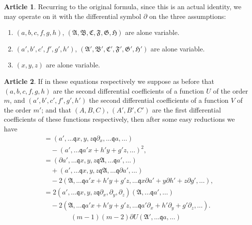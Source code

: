 \documentclass[11pt,a4paper]{article}
\theoremstyle{definition}
\newtheorem{art}{Article}[section]
\newcommand{\fA}{\mathfrak{A}}
\newcommand{\fB}{\mathfrak{B}}
\newcommand{\fC}{\mathfrak{C}}
\newcommand{\fF}{\mathfrak{F}}
\newcommand{\fG}{\mathfrak{G}}
\newcommand{\fH}{\mathfrak{H}}
\newcommand{\fApr}{\mathfrak{A}'}
\newcommand{\fBpr}{\mathfrak{B}'}
\newcommand{\fCpr}{\mathfrak{C}'}
\newcommand{\fFpr}{\mathfrak{F}'}
\newcommand{\fGpr}{\mathfrak{G}'}
\newcommand{\fHpr}{\mathfrak{H}'}
\begin{document}
\setcounter{art}{43}
\begin{art}
Recurring to the original formula, since this is an actual identity, we may
operate on it with the differential symbol $\partial$ on the three assumptions:
\begin{enumerate}[label=\arabic*.]
\item $(a, b, c, f, g, h)$, $(\fA, \fB, \fC, \fF, \fG, \fH)$ are alone variable.
\item $(a', b', c', f', g', h')$, $(\fApr, \fBpr, \fCpr, \fFpr, \fGpr, \fHpr)$ are alone variable.
\item $(x, y, z)$ are alone variable.
\end{enumerate}
\end{art}

\setcounter{art}{44}
\begin{art}
If in these equations respectively we suppose as before that $(a, b, c, f, g, h)$
are the second differential coefficients of a function $U$ of the order $m$, and
$(a', b', c', f', g', h')$ the second differential coefficients of a function $V$ of the order $m'$;
and that $(A, B, C)$, $(A', B', C')$ are the first differential coefficients of these functions
respectively, then after some easy reductions we have
\begin{align*}
&= (a', \dots \mathbin{\mathfrak{q}} x, y, z \mathbin{\mathfrak{q}} \partial_x, \dots \mathbin{\mathfrak{q}} a, \dots) \\
&\quad - (a', \dots \mathbin{\mathfrak{q}} a'x + h'y + g'z, \dots)^2, \\
&= (\partial a', \dots \mathbin{\mathfrak{q}} x, y, z \mathbin{\mathfrak{q}} \fA, \dots \mathbin{\mathfrak{q}} a', \dots) \\
&\quad + (a', \dots \mathbin{\mathfrak{q}} x, y, z \mathbin{\mathfrak{q}} \fA, \dots \mathbin{\mathfrak{q}} \partial a', \dots) \\
&\quad - 2(\fA, \dots \mathbin{\mathfrak{q}} a'x + h'y + g'z, \dots \mathbin{\mathfrak{q}} x\partial a' + y\partial h' + z\partial g', \dots), \\
&= 2(a', \dots \mathbin{\mathfrak{q}} x, y, z \mathbin{\mathfrak{q}} \partial_x, \partial_y, \partial_z)(\fA, \dots \mathbin{\mathfrak{q}} a', \dots) \\
&\quad - 2(\fA, \dots \mathbin{\mathfrak{q}} a'x + h'y + g'z, \dots \mathbin{\mathfrak{q}} a'\partial_x + h'\partial_y + g'\partial_z, \dots).
\end{align*}
\begin{multline*}
(m-1)(m-2)\partial U (\fApr, \dots \mathbin{\mathfrak{q}} a, \dots)

\end{multline*}
\end{art}
\end{document}
